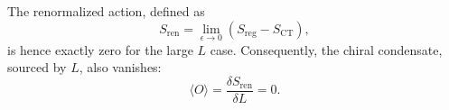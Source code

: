The renormalized action, defined as
\begin{equation}
 S_\text{ren} = \lim_{\epsilon\rightarrow 0} (S_\text{reg}-S_\text{CT}),
\end{equation}
is hence exactly zero for the large $L$ case. Consequently, the chiral condensate, sourced by $L$, also vanishes:
\begin{equation} 
\langle O \rangle = \frac{\delta S_\text{ren}}{\delta L} = 0. 
\end{equation}




 




